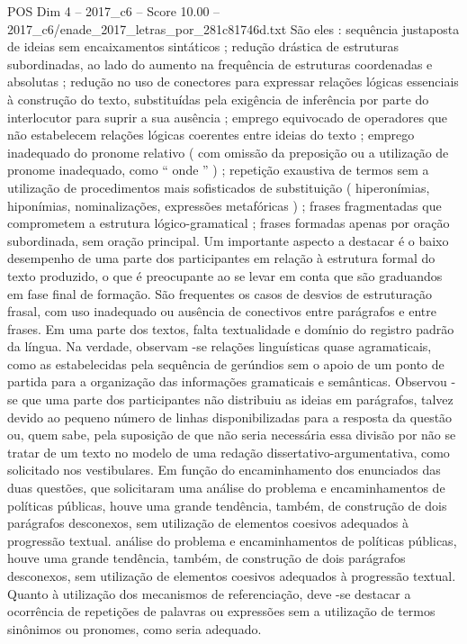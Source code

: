 \begin{textsample}{POS Dim 4 – 2017\_c6 – Score 10.00 – 2017\_c6/enade\_2017\_letras\_por\_281c81746d.txt}
São eles : sequência justaposta de ideias sem encaixamentos sintáticos ; redução drástica de estruturas subordinadas, ao lado do aumento na frequência de estruturas coordenadas e absolutas ; redução no uso de conectores para expressar relações lógicas essenciais à construção do texto, substituídas pela exigência de inferência por parte do interlocutor para suprir a sua ausência ; emprego equivocado de operadores que não estabelecem relações lógicas coerentes entre ideias do texto ; emprego inadequado do pronome relativo ( com omissão da preposição ou a utilização de pronome inadequado, como “ onde ” ) ; repetição exaustiva de termos sem a utilização de procedimentos mais sofisticados de substituição ( hiperonímias, hiponímias, nominalizações, expressões metafóricas ) ; frases fragmentadas que comprometem a estrutura lógico-gramatical ; frases formadas apenas por oração subordinada, sem oração principal.
Um importante aspecto a destacar é o baixo desempenho de uma parte dos participantes em relação à estrutura formal do texto produzido, o que é preocupante ao se levar em conta que são graduandos em fase final de formação.
São frequentes os casos de desvios de estruturação frasal, com uso inadequado ou ausência de conectivos entre parágrafos e entre frases.
Em uma parte dos textos, falta textualidade e domínio do registro padrão da língua.
Na verdade, observam -se relações linguísticas quase agramaticais, como as estabelecidas pela sequência de gerúndios sem o apoio de um ponto de partida para a organização das informações gramaticais e semânticas.
Observou -se que uma parte dos participantes não distribuiu as ideias em parágrafos, talvez devido ao pequeno número de linhas disponibilizadas para a resposta da questão ou, quem sabe, pela suposição de que não seria necessária essa divisão por não se tratar de um texto no modelo de uma redação dissertativo-argumentativa, como solicitado nos vestibulares.
Em função do encaminhamento dos enunciados das duas questões, que solicitaram uma análise do problema e encaminhamentos de políticas públicas, houve uma grande tendência, também, de construção de dois parágrafos desconexos, sem utilização de elementos coesivos adequados à progressão textual. análise do problema e encaminhamentos de políticas públicas, houve uma grande tendência, também, de construção de dois parágrafos desconexos, sem utilização de elementos coesivos adequados à progressão textual.
Quanto à utilização dos mecanismos de referenciação, deve -se destacar a ocorrência de repetições de palavras ou expressões sem a utilização de termos sinônimos ou pronomes, como seria adequado.

\end{textsample}
